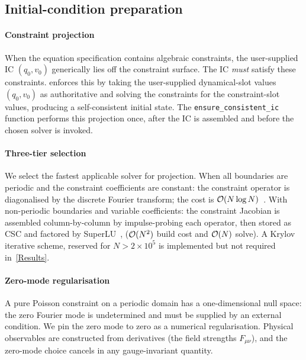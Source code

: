 \subsection{Initial-condition preparation}%
\label{ICPreparation}

\paragraph*{Constraint projection}%
\label{ConstraintIC}
When the equation specification contains
algebraic constraints, the user-supplied IC
$(q_0, v_0)$ generically lies off the constraint surface. The IC
\emph{must} satisfy these constraints.
\TIDAL{} enforces this by taking the
user-supplied dynamical-slot values $(q_0, v_0)$ as authoritative and
solving the constraints for the constraint-slot
values, producing a self-consistent initial state. The
\lstinline!ensure_consistent_ic! function performs this projection
once, after the IC is assembled and before the chosen
solver is invoked.

\paragraph*{Three-tier selection} We
select the fastest applicable solver for projection.
When all boundaries are periodic and the constraint coefficients are
constant: the constraint operator is diagonalised by the discrete
Fourier transform; the cost is $\mathcal{O}(N\log N)$~\cite{cooley1965fft}.
With non-periodic boundaries and variable coefficients: the
constraint Jacobian is assembled column-by-column by impulse-probing
each operator, then stored as
CSC and factored by SuperLU~\cite{demmel1999supernodal,demmel1999superlumt},
($\mathcal{O}(N^2)$ build cost and $\mathcal{O}(N)$ solve). A Krylov iterative scheme, reserved for
$N>2\times 10^{5}$ is
implemented but not required in~\cref{Results}.

\paragraph*{Zero-mode regularisation} A pure Poisson constraint on a
periodic domain has a one-dimensional null space: the zero Fourier
mode is undetermined and must be supplied by
an external condition. We pin the zero mode to zero as a numerical
regularisation.
Physical observables are constructed from
derivatives (the field strengths $F_{\mu\nu}$), and the zero-mode
choice cancels in any gauge-invariant quantity.

